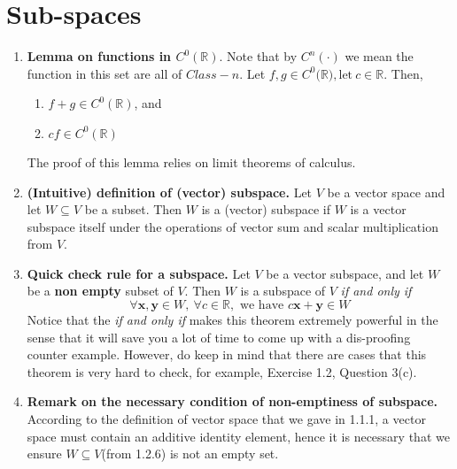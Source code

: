 \documentclass[oneside, 12pt]{book}
\newcommand{\settag}[1]{\renewcommand{\theenumi}{#1}}
\newcommand{\R}{\mathbb{R}}
\newcommand{\tit}[1]{\textit{#1}}
\begin{document}
\section{Sub-spaces}
    \begin{enumerate}
        \settag{1.2.4}
        \item \textbf{Lemma on functions in $C^0(\mathbb{R})$}. Note that by $C^n(\cdot)$ we mean the function 
        in this set are all of $Class-n$. Let $f,g \in C^0(\mathbb{R)}, \text{let} ~c\in \mathbb{R}$. Then, 
        \begin{enumerate}
            \item $f+g\in C^0(\R)$, and
            \item $cf \in C^0(\R)$
        \end{enumerate}
        The proof of this lemma relies on limit theorems of calculus.\newline
        
        \settag{1.2.6}
        \item \textbf{(Intuitive) definition of (vector) subspace.} Let $V$ be a vector space and let $W\subseteq V$
         be a subset. Then $W$ is a (vector) subspace if $W$ is a vector subspace itself under the operations of vector
          sum and scalar multiplication from $V$.
        
        \settag{1.2.8}
        \item \textbf{Quick check rule for a subspace.} Let $V$ be a vector subspace, and let $W$ be a \textbf{non empty} 
        subset of $V$. Then $W$ is a subspace of $V$ \tit{if and only if} 
        \begin{equation*}
            \forall \mathbf{x}, \mathbf{y}\in W,~\forall c\in \R, \text{ we have } c\mathbf{x}+\mathbf{y}\in W
        \end{equation*}
        Notice that the \tit{if and only if} makes this theorem extremely powerful in the sense that it will save you a
         lot of time to come up with a dis-proofing counter example. However, do keep in mind that there are cases that 
         this theorem is very hard to check, for example, Exercise 1.2, Question 3(c).
        
        \settag{1.2.9}
        \item \textbf{Remark on the necessary condition of non-emptiness of subspace.} According to the definition of 
        vector space that we gave in 1.1.1, a vector space must contain an additive identity element, hence it is necessary 
        that we ensure $W\subseteq V$(from 1.2.6) is not an empty set.
        

\end{enumerate}
\end{document}
